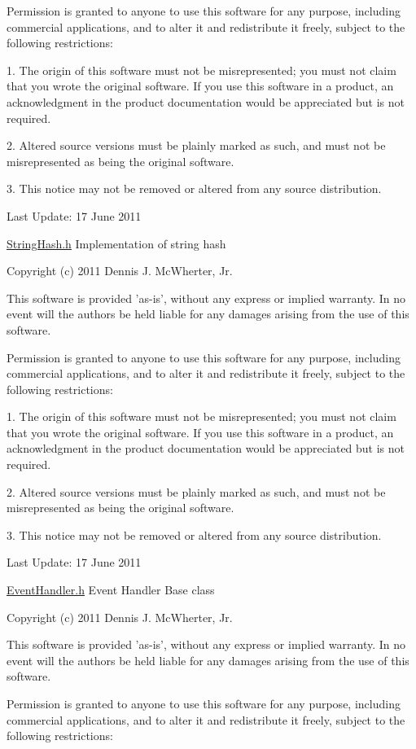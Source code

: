 Permission is granted to anyone to use this software for any purpose, including commercial applications, and to alter it and redistribute it freely, subject to the following restrictions:

1. The origin of this software must not be misrepresented; you must not claim that you wrote the original software. If you use this software in a product, an acknowledgment in the product documentation would be appreciated but is not required.

2. Altered source versions must be plainly marked as such, and must not be misrepresented as being the original software.

3. This notice may not be removed or altered from any source distribution.

Last Update: 17 June 2011

\hyperlink{_string_hash_8h_source}{StringHash.h} Implementation of string hash

Copyright (c) 2011 Dennis J. McWherter, Jr.

This software is provided 'as-\/is', without any express or implied warranty. In no event will the authors be held liable for any damages arising from the use of this software.

Permission is granted to anyone to use this software for any purpose, including commercial applications, and to alter it and redistribute it freely, subject to the following restrictions:

1. The origin of this software must not be misrepresented; you must not claim that you wrote the original software. If you use this software in a product, an acknowledgment in the product documentation would be appreciated but is not required.

2. Altered source versions must be plainly marked as such, and must not be misrepresented as being the original software.

3. This notice may not be removed or altered from any source distribution.

Last Update: 17 June 2011

\hyperlink{_event_handler_8h_source}{EventHandler.h} Event Handler Base class

Copyright (c) 2011 Dennis J. McWherter, Jr.

This software is provided 'as-\/is', without any express or implied warranty. In no event will the authors be held liable for any damages arising from the use of this software.

Permission is granted to anyone to use this software for any purpose, including commercial applications, and to alter it and redistribute it freely, subject to the following restrictions:

